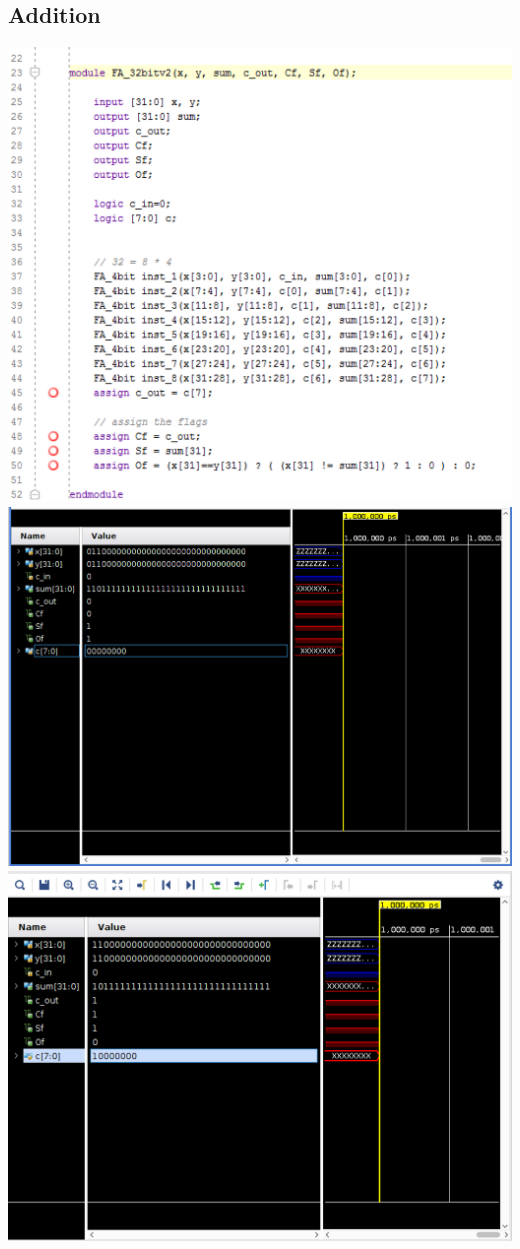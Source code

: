 \documentclass{article}
\begin{document}
\subsection{Addition}
\includegraphics[scale=0.5]{photos/32bit_adder_code}
\break
\includegraphics[scale=0.24]{photos/32bit_adder_boundary1}
\break
\includegraphics[scale=0.24]{photos/32bit_adder_boundary2}
\break
\end{document}
